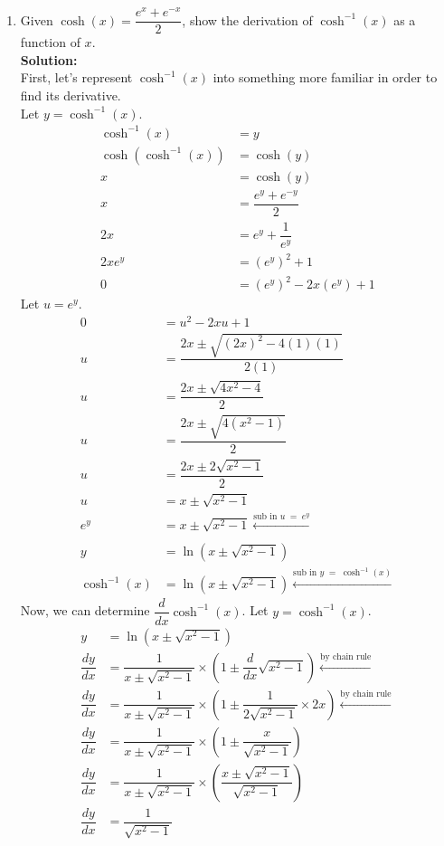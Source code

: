 \documentclass[12pt]{book}
\begin{document}
\begin{enumerate}

\item Given $\cosh(x)=\dfrac{e^x + e^{-x}}{2}$, show the derivation of $\cosh^{-1}(x)$ as a function of $x$.\\

\textbf{Solution:}\\
First, let's represent $\cosh^{-1}(x)$ into something more familiar in order to find its derivative.\\
Let $y = \cosh^{-1}(x)$.
\begin{align}
    \cosh^{-1}(x) &= y \\
    \cosh(\cosh^{-1}(x)) &= \cosh(y) \\
    x &= \cosh(y) \\
    x &= \dfrac{e^y + e^{-y}}{2} \\
    2x &= e^y + \dfrac{1}{e^y} \\
    2xe^y&= (e^y)^2 + 1\\
    0 &= (e^y)^2 - 2x(e^y) + 1
\end{align}
Let $u = e^y$.
\begin{align}
    0 &= u^2 - 2xu + 1\\
    u &= \dfrac{2x\pm\sqrt{(2x)^2-4(1)(1)}}{2(1)} \\
    u &= \dfrac{2x\pm\sqrt{4x^2-4}}{2} \\
    u &= \dfrac{2x\pm\sqrt{4(x^2-1)}}{2} \\
    u &= \dfrac{2x\pm2\sqrt{x^2-1}}{2} \\
    u &= x\pm\sqrt{x^2-1} \\
    e^y &= x\pm\sqrt{x^2-1} \xleftarrow[]{\text{sub in }u \; = \; e^y} \\
    y &= \ln(x\pm\sqrt{x^2-1}) \\
    \cosh^{-1}(x) &= \ln(x\pm\sqrt{x^2-1}) \xleftarrow[]{\text{sub in }y \; = \; \cosh^{-1}(x)}
\end{align}
Now, we can determine $\dfrac{d}{dx}\cosh^{-1}(x)$. Let $y = \cosh^{-1}(x)$.
\begin{align}
    y &= \ln(x\pm\sqrt{x^2-1}) \\
    \dfrac{dy}{dx} &= \dfrac{1}{x \pm \sqrt{x^2-1}} \times \left(1 \pm \dfrac{d}{dx}\sqrt{x^2-1}\right) \xleftarrow[]{\text{by chain rule}} \\
    \dfrac{dy}{dx} &= \dfrac{1}{x \pm \sqrt{x^2-1}} \times \left(1 \pm \dfrac{1}{2\sqrt{x^2-1}} \times 2x\right) \xleftarrow[]{\text{by chain rule}} \\
    \dfrac{dy}{dx} &= \dfrac{1}{x \pm \sqrt{x^2-1}} \times \left(1 \pm \dfrac{x}{\sqrt{x^2-1}}\right) \\
    \dfrac{dy}{dx} &= \dfrac{1}{x \pm \sqrt{x^2-1}} \times \left( \dfrac{x \pm \sqrt{x^2-1}}{\sqrt{x^2-1}}\right) \\
    \dfrac{dy}{dx} &= \dfrac{1}{\sqrt{x^2-1}}
\end{align}



\end{enumerate}
\end{document}

